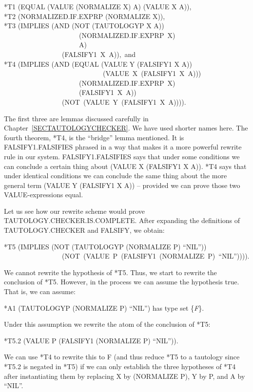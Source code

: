 \documentclass[10pt]{book}
\newenvironment{pubasis}{\begin{flushleft}}{\end{flushleft}}
\begin{document}
\begin{pubasis}
*T1	(EQUAL (VALUE (NORMALIZE X) A) (VALUE X A)),\\

*T2	(NORMALIZED.IF.EXPRP (NORMALIZE X)),\\

*T3	(IMPLIES (AND (NOT (TAUTOLOGYP X A))\\
~~~~~~~~~~~~~~~~~~~~~~(NORMALIZED.IF.EXPRP~X)\\
~~~~~~~~~~~~~~~~~~~~~~A)\\
~~~~~~~~~~~~~~~~~(FALSIFY1~X~A)),~and\\

*T4	(IMPLIES (AND (EQUAL (VALUE Y (FALSIFY1 X A))\\
~~~~~~~~~~~~~~~~~~~~~~~~~~~~~(VALUE~X~(FALSIFY1~X~A)))\\
~~~~~~~~~~~~~~~~~~~~~~(NORMALIZED.IF.EXPRP~X)\\
~~~~~~~~~~~~~~~~~~~~~~(FALSIFY1~X~A))\\
~~~~~~~~~~~~~~~~~(NOT~(VALUE~Y~(FALSIFY1~X~A)))).\\
\end{pubasis}
The first three are  lemmas discussed carefully in Chapter~\ref{SECTAUTOLOGYCHECKER}.
We have used shorter names here.
The fourth theorem, *T4, is  the ``bridge'' lemma mentioned.
It is  FALSIFY1.FALSIFIES phrased in a way that makes it a
more powerful rewrite rule in our system.  FALSIFY1.FALSIFIES says that under some conditions
we can conclude a certain thing about (VALUE X (FALSIFY1 X A)).
*T4 says that under identical conditions we can conclude the same
thing about the more general term (VALUE Y (FALSIFY1 X A)) -- provided
we can prove those two VALUE-expressions equal.

Let us see how our rewrite scheme would prove TAUTOLOGY.CHECKER.IS.COMPLETE.  After expanding the definitions of TAUTOLOGY.CHECKER and
FALSIFY, we obtain:
\begin{pubasis}
*T5	(IMPLIES (NOT (TAUTOLOGYP (NORMALIZE P) ``NIL''))\\
~~~~~~~~~~~~~~~~~(NOT~(VALUE~P~(FALSIFY1~(NORMALIZE~P)~``NIL'')))).\\
\end{pubasis}
We cannot rewrite the hypothesis of *T5.  Thus, we start to
rewrite the conclusion of *T5.  However, in the process we can
assume the hypothesis true.  That is, we can assume:

\begin{pubasis}
*A1	(TAUTOLOGYP (NORMALIZE P) ``NIL'') has type set \{\emph{F}\}.\\
\end{pubasis}
Under this assumption we rewrite the atom of the conclusion of *T5:
\begin{pubasis}
*T5.2	(VALUE P (FALSIFY1 (NORMALIZE P) ``NIL'')).\\
\end{pubasis}
We can use *T4 to rewrite this to F (and thus reduce *T5 to a
tautology since *T5.2 is negated in *T5) if we can only
establish the three hypotheses of *T4 after instantiating them
by replacing X by (NORMALIZE P), Y by P, and A by ``NIL''.
\end{document}
